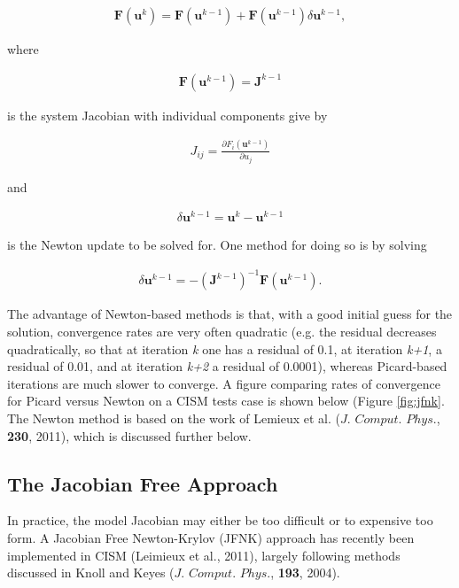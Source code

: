 \begin{align*}
\mathbf{F}(\mathbf{u}^{k})=\mathbf{F}(\mathbf{u}^{k-1})+\mathbf{F}(\mathbf{u}^{k-1})\delta \mathbf{u}^{k-1},
\end{align*}

where

\begin{align*}
\mathbf{F}(\mathbf{u}^{k-1})=\mathbf{J}^{k-1}
\end{align*}

is the system Jacobian with individual components give by

\begin{align*}
J_{ij}=\frac{\partial F_{i}(\mathbf{u}^{k-1})}{\partial u_{j}}
\end{align*}

and 

\begin{align*}
\delta \mathbf{u}^{k-1}=\mathbf{u}^{k}-\mathbf{u}^{k-1}
\end{align*}

is the Newton update to be solved for. One method for doing so is by solving 

\begin{align*}
\delta \mathbf{u}^{k-1}=-\left( \mathbf{J}^{k-1} \right)^{-1}\mathbf{F}(\mathbf{u}^{k-1}).
\end{align*}

The advantage of Newton-based methods is that, with a good initial guess for the solution, convergence rates are very often quadratic (e.g. the residual decreases quadratically, so that at iteration \textit{k} one has a residual of 0.1, at iteration \textit{k+1}, a residual of 0.01, and at iteration \textit{k+2} a residual of 0.0001), whereas Picard-based iterations are much slower to converge. A figure comparing rates of convergence for Picard versus Newton on a CISM tests case is shown below (Figure \ref{fig:jfnk}. The Newton method is based on the work of Lemieux et al. ($J.$ $Comput.$ $Phys.$, \textbf{230}, 2011), which is discussed further below.


\subsection{The Jacobian Free Approach}
In practice, the model Jacobian may either be too difficult or to expensive too form. A Jacobian Free Newton-Krylov (JFNK) approach has recently been implemented in CISM (Leimieux et al., 2011), largely following methods discussed in Knoll and Keyes ($J.$ $Comput.$ $Phys.$, \textbf{193}, 2004).

